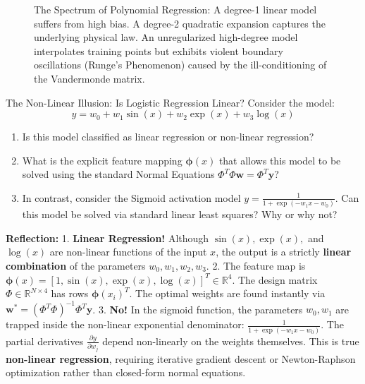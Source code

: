 \begin{figure}[htbp]
\begin{tikzpicture}[scale=0.95, font=\sffamily\footnotesize]
\end{tikzpicture}
\caption{The Spectrum of Polynomial Regression: A degree-1 linear model suffers from high bias. A degree-2 quadratic expansion captures the underlying physical law. An unregularized high-degree model interpolates training points but exhibits violent boundary oscillations (Runge's Phenomenon) caused by the ill-conditioning of the Vandermonde matrix.}
\label{fig:polynomial_spectrum}
\end{figure}

\begin{ponderbox}{The Non-Linear Illusion: Is Logistic Regression Linear?}
Consider the model:
\begin{equation*}
y = w_0 + w_1 \sin(x) + w_2 \exp(x) + w_3 \log(x)
\end{equation*}
\begin{enumerate}
    \item Is this model classified as linear regression or non-linear regression?
    \item What is the explicit feature mapping $\boldsymbol{\phi}(x)$ that allows this model to be solved using the standard Normal Equations $\Phi^T \Phi \mathbf{w} = \Phi^T \mathbf{y}$?
    \item In contrast, consider the Sigmoid activation model $y = \frac{1}{1 + \exp(-w_1 x - w_0)}$. Can this model be solved via standard linear least squares? Why or why not?
\end{enumerate}
\tcblower
\textbf{Reflection:}
1. \textbf{Linear Regression!} Although $\sin(x), \exp(x),$ and $\log(x)$ are non-linear functions of the input $x$, the output is a strictly \textbf{linear combination} of the parameters $w_0, w_1, w_2, w_3$.
2. The feature map is $\boldsymbol{\phi}(x) = [1, \sin(x), \exp(x), \log(x)]^T \in \mathbb{R}^4$. The design matrix $\Phi \in \mathbb{R}^{N \times 4}$ has rows $\boldsymbol{\phi}(x_i)^T$. The optimal weights are found instantly via $\mathbf{w}^* = (\Phi^T \Phi)^{-1}\Phi^T \mathbf{y}$.
3. \textbf{No!} In the sigmoid function, the parameters $w_0, w_1$ are trapped inside the non-linear exponential denominator: $\frac{1}{1 + \exp(-w_1 x - w_0)}$. The partial derivatives $\frac{\partial y}{\partial w_j}$ depend non-linearly on the weights themselves. This is true \textbf{non-linear regression}, requiring iterative gradient descent or Newton-Raphson optimization rather than closed-form normal equations.
\end{ponderbox}

